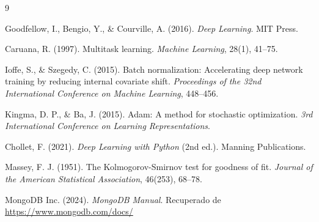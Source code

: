 \documentclass[12pt, a4paper]{report}
\begin{document}
\begin{thebibliography}{9}

Goodfellow, I., Bengio, Y., \& Courville, A. (2016).
\textit{Deep Learning}.
MIT Press.

Caruana, R. (1997).
Multitask learning.
\textit{Machine Learning}, 28(1), 41--75.

Ioffe, S., \& Szegedy, C. (2015).
Batch normalization: Accelerating deep network training by reducing internal covariate shift.
\textit{Proceedings of the 32nd International Conference on Machine Learning}, 448--456.

Kingma, D. P., \& Ba, J. (2015).
Adam: A method for stochastic optimization.
\textit{3rd International Conference on Learning Representations}.

Chollet, F. (2021).
\textit{Deep Learning with Python} (2nd ed.).
Manning Publications.

Massey, F. J. (1951).
The Kolmogorov-Smirnov test for goodness of fit.
\textit{Journal of the American Statistical Association}, 46(253), 68--78.

MongoDB Inc. (2024).
\textit{MongoDB Manual}.
Recuperado de \url{https://www.mongodb.com/docs/}

\end{thebibliography}
\end{document}
